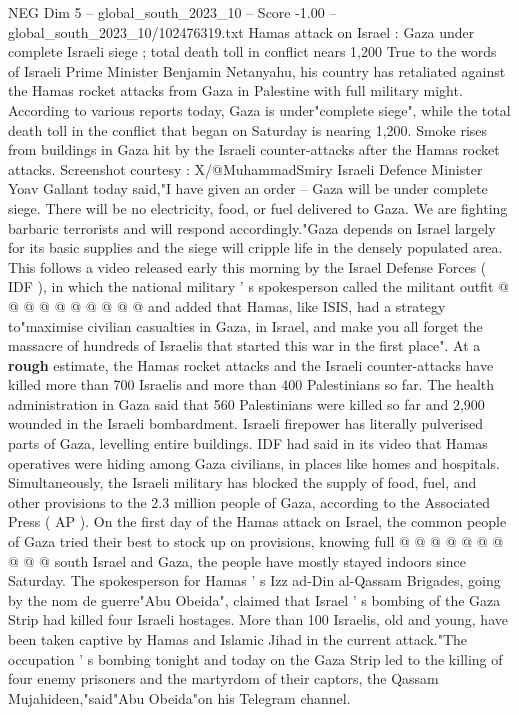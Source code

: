 \begin{textsample}{NEG Dim 5 – global\_south\_2023\_10 – Score -1.00 – global\_south\_2023\_10/102476319.txt}  \label{ex:f5_neg_095}
Hamas attack on Israel : Gaza under complete Israeli siege ; total death toll in conflict nears 1,200 True to the words of Israeli Prime Minister Benjamin Netanyahu, his country has retaliated against the Hamas rocket attacks from Gaza in Palestine with full military might.
According to various reports today, Gaza is under"complete siege", while the total death toll in the conflict that began on Saturday is nearing 1,200.
Smoke rises from buildings in Gaza hit by the Israeli counter-attacks after the Hamas rocket attacks.
Screenshot courtesy : X/@MuhammadSmiry Israeli Defence Minister Yoav Gallant today said,"I have given an order -- Gaza will be under complete siege.
There will be no electricity, food, or fuel delivered to Gaza.
We are fighting barbaric terrorists and will respond accordingly."Gaza depends on Israel largely for its basic supplies and the siege will cripple life in the densely populated area.
This follows a video released early this morning by the Israel Defense Forces ( IDF ), in which the national military ' s spokesperson called the militant outfit @ @ @ @ @ @ @ @ @ @ and added that Hamas, like ISIS, had a strategy to"maximise civilian casualties in Gaza, in Israel, and make you all forget the massacre of hundreds of Israelis that started this war in the first place".
At a \textbf{rough} estimate, the Hamas rocket attacks and the Israeli counter-attacks have killed more than 700 Israelis and more than 400 Palestinians so far.
The health administration in Gaza said that 560 Palestinians were killed so far and 2,900 wounded in the Israeli bombardment.
Israeli firepower has literally pulverised parts of Gaza, levelling entire buildings.
IDF had said in its video that Hamas operatives were hiding among Gaza civilians, in places like homes and hospitals.
Simultaneously, the Israeli military has blocked the supply of food, fuel, and other provisions to the 2.3 million people of Gaza, according to the Associated Press ( AP ).
On the first day of the Hamas attack on Israel, the common people of Gaza tried their best to stock up on provisions, knowing full @ @ @ @ @ @ @ @ @ @ south Israel and Gaza, the people have mostly stayed indoors since Saturday.
The spokesperson for Hamas ' s Izz ad-Din al-Qassam Brigades, going by the nom de guerre"Abu Obeida", claimed that Israel ' s bombing of the Gaza Strip had killed four Israeli hostages.
More than 100 Israelis, old and young, have been taken captive by Hamas and Islamic Jihad in the current attack."The occupation ' s bombing tonight and today on the Gaza Strip led to the killing of four enemy prisoners and the martyrdom of their captors, the Qassam Mujahideen,"said"Abu Obeida"on his Telegram channel.

\end{textsample}
